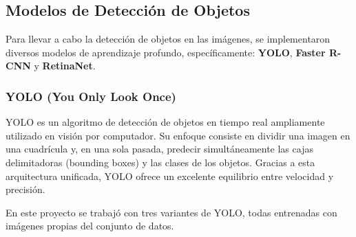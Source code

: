 \subsection{Modelos de Detección de Objetos}

Para llevar a cabo la detección de objetos en las imágenes, se implementaron diversos modelos de aprendizaje profundo, específicamente: \textbf{YOLO}, \textbf{Faster R-CNN} y \textbf{RetinaNet}.


\subsubsection{YOLO (You Only Look Once)}
YOLO es un algoritmo de detección de objetos en tiempo real ampliamente utilizado en visión por computador. Su enfoque consiste en dividir una imagen en una cuadrícula y, en una sola pasada, predecir simultáneamente las cajas delimitadoras (bounding boxes) y las clases de los objetos. Gracias a esta arquitectura unificada, YOLO ofrece un excelente equilibrio entre velocidad y precisión.

En este proyecto se trabajó con tres variantes de YOLO, todas entrenadas con imágenes propias del conjunto de datos.

